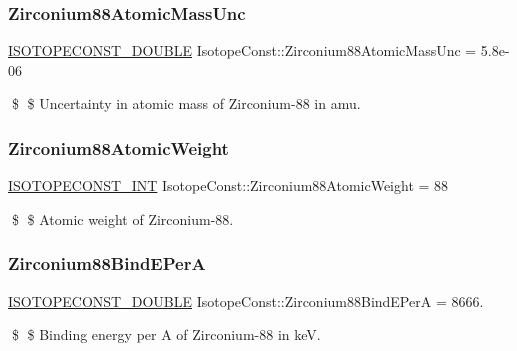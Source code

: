\subsubsection{\texorpdfstring{Zirconium88\+Atomic\+Mass\+Unc}{Zirconium88AtomicMassUnc}}
{\footnotesize\ttfamily \mbox{\hyperlink{group___isotope_const-_macros_ga8f45a7272ce02c0b4c65c44636ed719a}{I\+S\+O\+T\+O\+P\+E\+C\+O\+N\+S\+T\+\_\+\+D\+O\+U\+B\+LE}} Isotope\+Const\+::\+Zirconium88\+Atomic\+Mass\+Unc = 5.\+8e-\/06}

\$ \$ Uncertainty in atomic mass of Zirconium-\/88 in amu. \mbox{\label{group___isotope_const-_zirconium-_zr88_gae5e47bf7f2a925a42b589ca7d0270708}} 
\subsubsection{\texorpdfstring{Zirconium88\+Atomic\+Weight}{Zirconium88AtomicWeight}}
{\footnotesize\ttfamily \mbox{\hyperlink{group___isotope_const-_macros_ga5f18360b3e99483a35c32d789e62621c}{I\+S\+O\+T\+O\+P\+E\+C\+O\+N\+S\+T\+\_\+\+I\+NT}} Isotope\+Const\+::\+Zirconium88\+Atomic\+Weight = 88}

\$ \$ Atomic weight of Zirconium-\/88. \mbox{\label{group___isotope_const-_zirconium-_zr88_ga73039d052c4449954a5e25e57ad2eab1}} 
\subsubsection{\texorpdfstring{Zirconium88\+Bind\+E\+PerA}{Zirconium88BindEPerA}}
{\footnotesize\ttfamily \mbox{\hyperlink{group___isotope_const-_macros_ga8f45a7272ce02c0b4c65c44636ed719a}{I\+S\+O\+T\+O\+P\+E\+C\+O\+N\+S\+T\+\_\+\+D\+O\+U\+B\+LE}} Isotope\+Const\+::\+Zirconium88\+Bind\+E\+PerA = 8666.}

\$ \$ Binding energy per A of Zirconium-\/88 in keV. \mbox{\label{group___isotope_const-_zirconium-_zr88_gad5a038a21780613b9d58e1567e76d09f}} 
